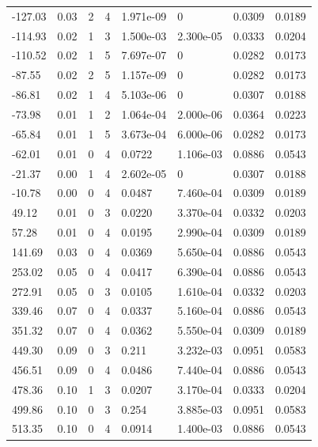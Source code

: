 \documentclass[preview]{standalone}
\begin{document}
{{\begin{tabular}{L{1.2cm}C{1.2cm} C{0.3cm}C{0.5cm} C{1.4cm}C{1.4cm} C{1.4cm}C{1.4cm}}
  -127.03  &  0.03  & 2     &  4 &  1.971e-09  & 0  & 0.0309 &  0.0189   \\ 
  -114.93  &  0.02  & 1     &  3 &  1.500e-03  & 2.300e-05  & 0.0333 &  0.0204   \\ 
  -110.52  &  0.02  & 1     &  5 &  7.697e-07  & 0  & 0.0282 &  0.0173   \\ 
  -87.55  &  0.02  & 2     &  5 &  1.157e-09  & 0  & 0.0282 &  0.0173   \\ 
  -86.81  &  0.02  & 1     &  4 &  5.103e-06  & 0  & 0.0307 &  0.0188   \\ 
  -73.98  &  0.01  & 1     &  2 &  1.064e-04  & 2.000e-06  & 0.0364 &  0.0223   \\ 
  -65.84  &  0.01  & 1     &  5 &  3.673e-04  & 6.000e-06  & 0.0282 &  0.0173   \\ 
  -62.01  &  0.01  & 0     &  4 &  0.0722  & 1.106e-03  & 0.0886 &  0.0543   \\ 
  -21.37  &  0.00  & 1     &  4 &  2.602e-05  & 0  & 0.0307 &  0.0188   \\ 
  -10.78  &  0.00  & 0     &  4 &  0.0487  & 7.460e-04  & 0.0309 &  0.0189   \\ 
  49.12  &  0.01  & 0     &  3 &  0.0220  & 3.370e-04  & 0.0332 &  0.0203   \\ 
  57.28  &  0.01  & 0     &  4 &  0.0195  & 2.990e-04  & 0.0309 &  0.0189   \\ 
  141.69  &  0.03  & 0     &  4 &  0.0369  & 5.650e-04  & 0.0886 &  0.0543   \\ 
  253.02  &  0.05  & 0     &  4 &  0.0417  & 6.390e-04  & 0.0886 &  0.0543   \\ 
  272.91  &  0.05  & 0     &  3 &  0.0105  & 1.610e-04  & 0.0332 &  0.0203   \\ 
  339.46  &  0.07  & 0     &  4 &  0.0337  & 5.160e-04  & 0.0886 &  0.0543   \\ 
  351.32  &  0.07  & 0     &  4 &  0.0362  & 5.550e-04  & 0.0309 &  0.0189   \\ 
  449.30  &  0.09  & 0     &  3 &  0.211  & 3.232e-03  & 0.0951 &  0.0583   \\ 
  456.51  &  0.09  & 0     &  4 &  0.0486  & 7.440e-04  & 0.0886 &  0.0543   \\ 
  478.36  &  0.10  & 1     &  3 &  0.0207  & 3.170e-04  & 0.0333 &  0.0204   \\ 
  499.86  &  0.10  & 0     &  3 &  0.254  & 3.885e-03  & 0.0951 &  0.0583   \\ 
  513.35  &  0.10  & 0     &  4 &  0.0914  & 1.400e-03  & 0.0886 &  0.0543   \\ 

\end{tabular}}}
\end{document}
